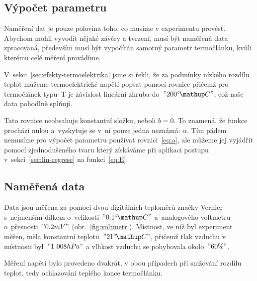 \subsection{Výpočet parametru}
Naměření dat je pouze polovina toho, co musíme v experimentu provést. Abychom
mohli vyvodit nějaké závěry a tvrzení, musí být naměřená data zpracovaná,
především musí být vypočítán samotný parametr termočlánku, kvůli kterému
celé měření provádíme.

V~sekci~\ref{sec:efekty-termoelektrika} jsme si řekli, že za podmínky nízkého
rozdílu teplot můžeme termoelektrické napětí popsat pomocí rovnice
přičemž pro termočlánek typu~T je závislost lineární zhruba do~$"200 \C"$, což
naše data pohodlně splňují.~\cite{thermocoupleinfo}

Tato rovnice neobsahuje konstantní složku, neboli $b=0$. To znamená, že funkce
prochází nulou a~vyskytuje se v~ní pouze jedna neznámá: $\alpha$. Tím pádem
nemusíme pro výpočet parametru používat rovnici~\eqref{eq:a}, ale můžeme jej
vyjádřit pomocí zjednodušeného tvaru
který získáváme při aplikaci postupu v~sekci~\ref{sec:lin-regrese} na 
funkci~\eqref{eq:E}. 


\subsection{Naměřená data}
Data jsou měřena za pomoci dvou digitálních teploměrů značky Vernier
s~nejmenším dílkem o~velikosti~$"0.1 \C"$ a~analogového voltmetru
o~přesnosti~$"0.2 mV"$ (obr.~\ref{fig:voltmetr}).
Místnost, ve níž byl experiment měřen, měla konstantní teplotu~$"21 \C"$,
přičemž tlak vzduchu v místnosti byl~$"1~008 hPa"$ a vlhkost vzduchu se
pohybovala okolo~$"60 \%"$.

Měření napětí bylo provedeno dvakrát, v obou případech při snižování rozdílu 
teplot, tedy ochlazování teplého konce termočlánku.

